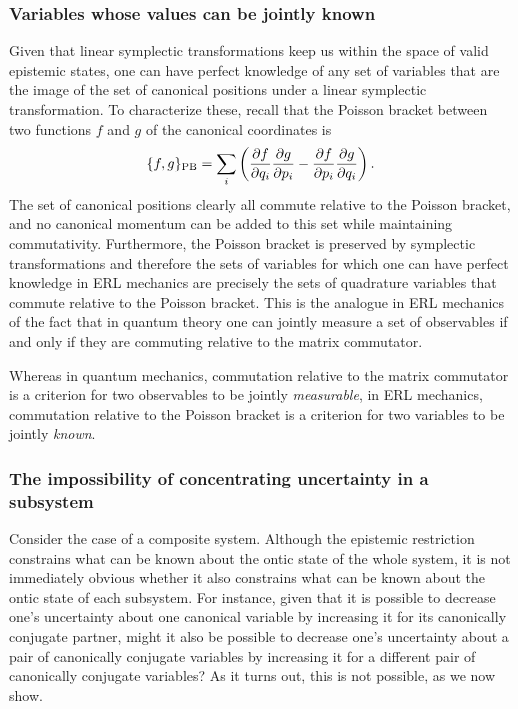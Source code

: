 \documentclass[pra,superscriptaddress,nofootinbib,12pt]{revtex4-2}
\def\be{\begin{equation}}
\def\ee{\end{equation}}
\begin{document}
\subsubsection{Variables whose values can be jointly known}

Given that linear symplectic transformations keep us within the space of valid epistemic states, one can have perfect knowledge of any set of variables that are the image of the set of canonical positions under a linear symplectic transformation.  To characterize these, recall that the Poisson bracket between two functions $f$ and $g$ of the canonical coordinates is
\be
\{f,g\}_{\rm PB}= \sum_i \left( \frac{\partial f}{\partial q_i} \frac{\partial g}{\partial p_i}-\frac{\partial f}{\partial p_i} \frac{\partial g}{\partial q_i} \right).
\ee
The set of canonical positions clearly all commute relative to the Poisson bracket, and no canonical momentum can be added to this set while maintaining commutativity. Furthermore, the Poisson bracket is preserved by symplectic transformations
 and therefore the sets of variables for which one can have perfect knowledge in ERL mechanics are precisely the sets of quadrature variables that commute relative to the Poisson bracket.  This is the analogue in ERL mechanics of the fact that in quantum theory one can jointly measure a set of observables if and only if they are commuting relative to the matrix commutator.

Whereas in quantum mechanics, commutation relative to the matrix commutator is a criterion for two observables to be jointly \emph{measurable}, in ERL mechanics, commutation relative to the Poisson bracket is a criterion for two variables to be jointly \emph{known}.

\subsubsection{The impossibility of concentrating uncertainty in a subsystem}

Consider the case of a composite system.  Although the epistemic restriction constrains what can be known about the ontic state of the whole system, it is not immediately obvious whether it also constrains what can be known about the ontic state of each subsystem.
For instance, given that it is possible to decrease one's uncertainty about one canonical variable by increasing it for its canonically conjugate partner, might it also be possible to decrease one's uncertainty about a pair of canonically conjugate variables by increasing it for a different pair of canonically conjugate variables?
As it turns out, this is not possible, as we now show.
\end{document}
